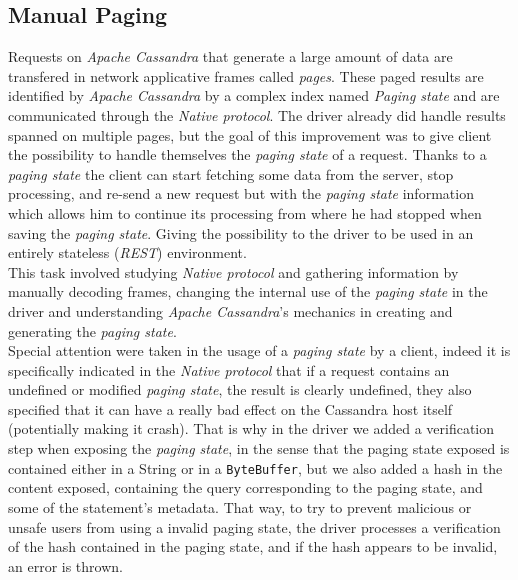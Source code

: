 \documentclass[a4paper]{report}
\newcommand{\ca}{\emph{Apache Cassandra\xspace}}
\begin{document}
\subsection{Manual Paging}
Requests on \ca{} that generate a large amount of data are transfered in network applicative frames called \emph{pages}. These paged results are identified by \ca{} by a complex index named \emph{Paging state} and are communicated through the \emph{Native protocol}. The driver already did handle results spanned on multiple pages, but the goal of this improvement was to give client the possibility to handle themselves the \emph{paging state} of a request. Thanks to a \emph{paging state} the client can start fetching some data from the server, stop processing, and re-send a new request but with the \emph{paging state} information which allows him to continue its processing from where he had stopped when saving the \emph{paging state}. Giving the possibility to the driver to be used in an entirely stateless (\emph{REST}) environment. \\
This task involved studying \emph{Native protocol} and gathering information by manually decoding frames, changing the internal use of the \emph{paging state} in the driver and understanding \ca{}'s mechanics in creating and generating the \emph{paging state}.\\
Special attention were taken in the usage of a \emph{paging state} by a client, indeed it is specifically indicated in the \emph{Native protocol} that if a request contains an undefined or modified \emph{paging state}, the result is clearly undefined, they also specified that it can have a really bad effect on the Cassandra host itself (potentially making it crash). That is why in the driver we added a verification step when exposing the \emph{paging state}, in the sense that the paging state exposed is contained either in a String or in a \verb;ByteBuffer;, but we also added a hash in the content exposed, containing the query corresponding to the paging state, and some of the statement's metadata. That way, to try to prevent malicious or unsafe users from using a invalid paging state, the driver processes a verification of the hash contained in the paging state, and if the hash appears to be invalid, an error is thrown.
\end{document}

